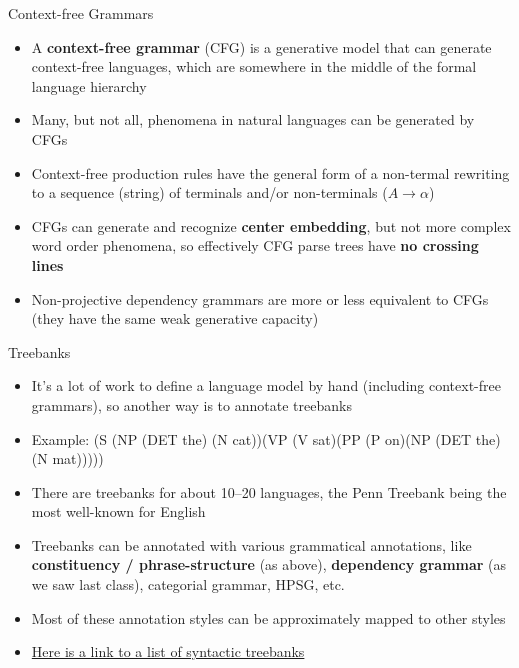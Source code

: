 \documentclass[xcolor=pdftex,x11names,table,hyperref]{beamer}
\newcommand{\detail}[1]{{\color{lightgrey}\small{}#1}}
\begin{document}
\begin{frame}{Context-free Grammars}
\begin{itemize}
	\item A \textbf{context-free grammar} (CFG) is a generative model that can generate context-free languages, which are somewhere in the middle of the formal language hierarchy
	\item Many, but not all, phenomena in natural languages can be generated by CFGs
	\pause
	\item Context-free production rules have the general form of a non-termal rewriting to a sequence (string) of terminals and/or non-terminals \detail{($A \rightarrow \alpha$)}
	\pause
	\item CFGs can generate and recognize \textbf{center embedding}, but not more complex word order phenomena, so effectively CFG parse trees have \textbf{no crossing lines}
	\pause
	\item Non-projective dependency grammars are more or less equivalent to CFGs \detail{(they have the same weak generative capacity)}
\end{itemize}
\end{frame}


\begin{frame}{Treebanks}
\begin{itemize}
	\item It's a lot of work to define a language model by hand (including context-free grammars), so another way is to annotate treebanks
	\item Example:
			(S (NP (DET the) (N cat))(VP (V sat)(PP (P on)(NP (DET the) (N mat)))))
	\pause
	\item There are treebanks for about 10--20 languages, the Penn Treebank being the most well-known for English
	\pause
	\item Treebanks can be annotated with various grammatical annotations, like \textbf{constituency / phrase-structure} (as above), \textbf{dependency grammar} (as we saw last class), categorial grammar, HPSG, etc.
	\item Most of these annotation styles can be approximately mapped to other styles
	\pause
	\item \href{https://en.wikipedia.org/wiki/Treebank\#Syntactic_treebanks}{Here is a link to a list of syntactic treebanks} 
\end{itemize}
\end{frame}
\end{document}
